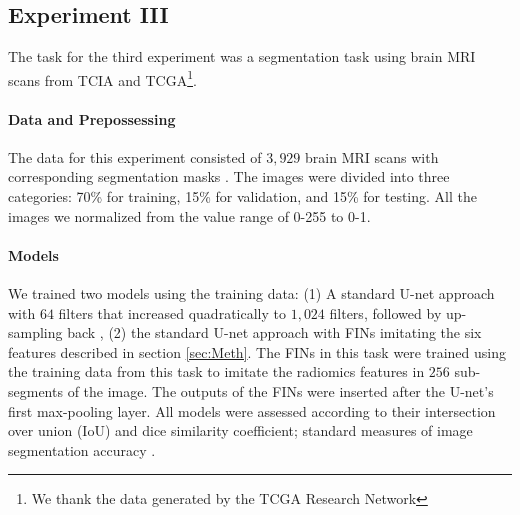 \documentclass{article}
\begin{document}
\subsection{Experiment III} \label{sec:Exp3}
The task for the third experiment was a segmentation task using brain MRI scans from TCIA and TCGA\footnote{We thank the data generated by the TCGA Research Network}.




\paragraph*{Data and Prepossessing} The data for this experiment consisted of $3,929$ brain MRI scans with corresponding segmentation masks \cite{brainMRI} . The images were divided into three categories: 70\% for training, 15\% for validation, and 15\% for testing. All the images we normalized from the value range of 0-255 to 0-1.

\paragraph*{Models} We trained two models using the training data: (1) A standard U-net approach with $64$ filters that increased quadratically to $1,024$ filters, followed by up-sampling back \cite{9446143}, (2) the standard U-net approach with FINs imitating the six features described in section \ref{sec:Meth}. The FINs in this task were trained using the training data from this task to imitate the radiomics features in $256$ sub-segments of the image. The outputs of the FINs were inserted after the U-net's first max-pooling layer. All models were assessed according to their intersection over union (IoU) and dice similarity coefficient; standard measures of image segmentation accuracy \cite{jha2020kvasir}.
\end{document}
